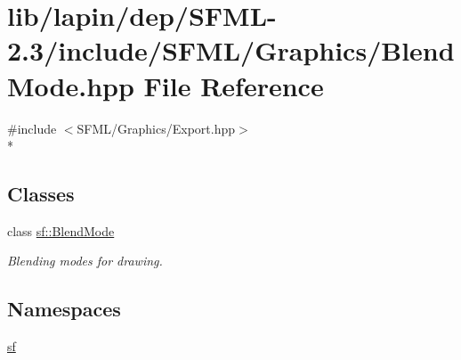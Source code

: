 \hypertarget{lapin_2dep_2_s_f_m_l-2_83_2include_2_s_f_m_l_2_graphics_2_blend_mode_8hpp}{\section{lib/lapin/dep/\-S\-F\-M\-L-\/2.3/include/\-S\-F\-M\-L/\-Graphics/\-Blend\-Mode.hpp File Reference}
\label{lapin_2dep_2_s_f_m_l-2_83_2include_2_s_f_m_l_2_graphics_2_blend_mode_8hpp}
}
{\ttfamily \#include $<$S\-F\-M\-L/\-Graphics/\-Export.\-hpp$>$}\\*
\subsection*{Classes}
\begin{DoxyCompactItemize}
\item 
class \hyperlink{structsf_1_1_blend_mode}{sf\-::\-Blend\-Mode}
\begin{DoxyCompactList}\small\item\em Blending modes for drawing. \end{DoxyCompactList}\end{DoxyCompactItemize}
\subsection*{Namespaces}
\begin{DoxyCompactItemize}
\item 
\hyperlink{namespacesf}{sf}
\end{DoxyCompactItemize}
